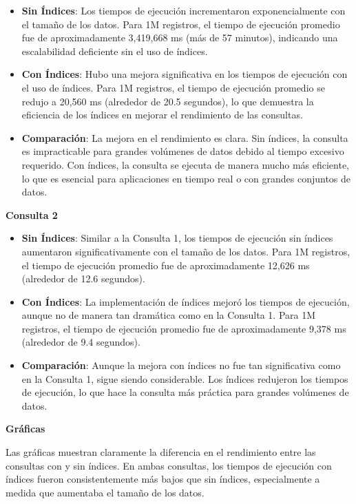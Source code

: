 \documentclass[12pt,a4paper]{article}
\begin{document}
\begin{itemize}
    \item \textbf{Sin Índices}: Los tiempos de ejecución incrementaron exponencialmente con el tamaño de los datos. Para 1M registros, el tiempo de ejecución promedio fue de aproximadamente 3,419,668 ms (más de 57 minutos), indicando una escalabilidad deficiente sin el uso de índices.
  
    \item \textbf{Con Índices}: Hubo una mejora significativa en los tiempos de ejecución con el uso de índices. Para 1M registros, el tiempo de ejecución promedio se redujo a 20,560 ms (alrededor de 20.5 segundos), lo que demuestra la eficiencia de los índices en mejorar el rendimiento de las consultas.

    \item \textbf{Comparación}: La mejora en el rendimiento es clara. Sin índices, la consulta es impracticable para grandes volúmenes de datos debido al tiempo excesivo requerido. Con índices, la consulta se ejecuta de manera mucho más eficiente, lo que es esencial para aplicaciones en tiempo real o con grandes conjuntos de datos.
\end{itemize}

\textbf{Consulta 2}

\begin{itemize}
    \item \textbf{Sin Índices}: Similar a la Consulta 1, los tiempos de ejecución sin índices aumentaron significativamente con el tamaño de los datos. Para 1M registros, el tiempo de ejecución promedio fue de aproximadamente 12,626 ms (alrededor de 12.6 segundos).

    \item \textbf{Con Índices}: La implementación de índices mejoró los tiempos de ejecución, aunque no de manera tan dramática como en la Consulta 1. Para 1M registros, el tiempo de ejecución promedio fue de aproximadamente 9,378 ms (alrededor de 9.4 segundos).

    \item \textbf{Comparación}: Aunque la mejora con índices no fue tan significativa como en la Consulta 1, sigue siendo considerable. Los índices redujeron los tiempos de ejecución, lo que hace la consulta más práctica para grandes volúmenes de datos.
\end{itemize}

\textbf{Gráficas}

Las gráficas muestran claramente la diferencia en el rendimiento entre las consultas con y sin índices. En ambas consultas, los tiempos de ejecución con índices fueron consistentemente más bajos que sin índices, especialmente a medida que aumentaba el tamaño de los datos.
\end{document}
